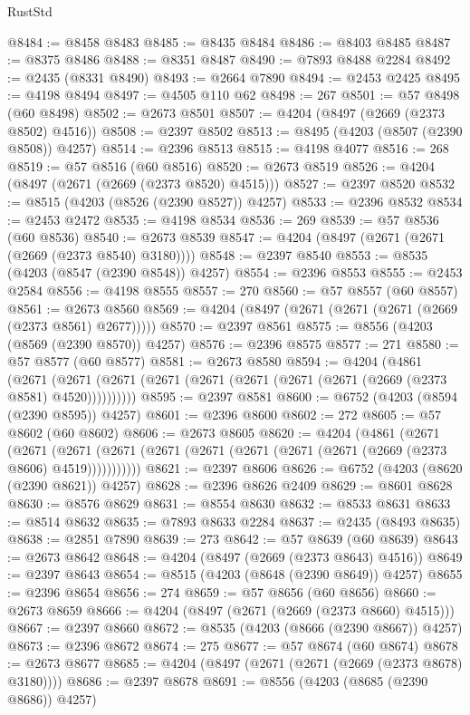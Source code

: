 \begin{lexlean}{RustStd}
\begin{coremodule}
@8484 := @8458 @8483
@8485 := @8435 @8484
@8486 := @8403 @8485
@8487 := @8375 @8486
@8488 := @8351 @8487
@8490 := @7893 @8488 @2284
@8492 := @2435 (@8331 @8490)
@8493 := @2664 @7890
@8494 := @2453 @2425
@8495 := @4198 @8494
@8497 := @4505 @110 @62
@8498 := 267
@8501 := @57 @8498 (@60 @8498)
@8502 := @2673 @8501
@8507 := @4204 (@8497 (@2669 (@2373 @8502) @4516))
@8508 := @2397 @8502
@8513 := @8495 (@4203 (@8507 (@2390 @8508)) @4257)
@8514 := @2396 @8513
@8515 := @4198 @4077
@8516 := 268
@8519 := @57 @8516 (@60 @8516)
@8520 := @2673 @8519
@8526 := @4204 (@8497 (@2671 (@2669 (@2373 @8520) @4515)))
@8527 := @2397 @8520
@8532 := @8515 (@4203 (@8526 (@2390 @8527)) @4257)
@8533 := @2396 @8532
@8534 := @2453 @2472
@8535 := @4198 @8534
@8536 := 269
@8539 := @57 @8536 (@60 @8536)
@8540 := @2673 @8539
@8547 := @4204 (@8497 (@2671 (@2671 (@2669 (@2373 @8540) @3180))))
@8548 := @2397 @8540
@8553 := @8535 (@4203 (@8547 (@2390 @8548)) @4257)
@8554 := @2396 @8553
@8555 := @2453 @2584
@8556 := @4198 @8555
@8557 := 270
@8560 := @57 @8557 (@60 @8557)
@8561 := @2673 @8560
@8569 := @4204 (@8497 (@2671 (@2671 (@2671 (@2669 (@2373 @8561) @2677)))))
@8570 := @2397 @8561
@8575 := @8556 (@4203 (@8569 (@2390 @8570)) @4257)
@8576 := @2396 @8575
@8577 := 271
@8580 := @57 @8577 (@60 @8577)
@8581 := @2673 @8580
@8594 := @4204
    (@4861
      (@2671 (@2671 (@2671 (@2671 (@2671 (@2671 (@2671 (@2671 (@2669 (@2373 @8581) @4520))))))))))
@8595 := @2397 @8581
@8600 := @6752 (@4203 (@8594 (@2390 @8595)) @4257)
@8601 := @2396 @8600
@8602 := 272
@8605 := @57 @8602 (@60 @8602)
@8606 := @2673 @8605
@8620 := @4204
    (@4861
      (@2671
        (@2671
          (@2671 (@2671 (@2671 (@2671 (@2671 (@2671 (@2671 (@2669 (@2373 @8606) @4519)))))))))))
@8621 := @2397 @8606
@8626 := @6752 (@4203 (@8620 (@2390 @8621)) @4257)
@8628 := @2396 @8626 @2409
@8629 := @8601 @8628
@8630 := @8576 @8629
@8631 := @8554 @8630
@8632 := @8533 @8631
@8633 := @8514 @8632
@8635 := @7893 @8633 @2284
@8637 := @2435 (@8493 @8635)
@8638 := @2851 @7890
@8639 := 273
@8642 := @57 @8639 (@60 @8639)
@8643 := @2673 @8642
@8648 := @4204 (@8497 (@2669 (@2373 @8643) @4516))
@8649 := @2397 @8643
@8654 := @8515 (@4203 (@8648 (@2390 @8649)) @4257)
@8655 := @2396 @8654
@8656 := 274
@8659 := @57 @8656 (@60 @8656)
@8660 := @2673 @8659
@8666 := @4204 (@8497 (@2671 (@2669 (@2373 @8660) @4515)))
@8667 := @2397 @8660
@8672 := @8535 (@4203 (@8666 (@2390 @8667)) @4257)
@8673 := @2396 @8672
@8674 := 275
@8677 := @57 @8674 (@60 @8674)
@8678 := @2673 @8677
@8685 := @4204 (@8497 (@2671 (@2671 (@2669 (@2373 @8678) @3180))))
@8686 := @2397 @8678
@8691 := @8556 (@4203 (@8685 (@2390 @8686)) @4257)

\end{coremodule}
\end{lexlean}
